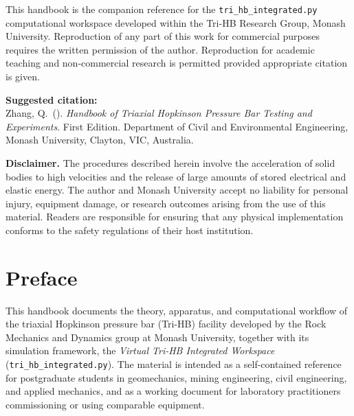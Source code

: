 \documentclass[11pt,a4paper,openany]{book}
\theoremstyle{handbook}
\begin{document}
\bigskip
\noindent This handbook is the companion reference for the
\texttt{tri\_hb\_integrated.py} computational workspace developed within the
Tri-HB Research Group, Monash University. Reproduction of any part of this
work for commercial purposes requires the written permission of the author.
Reproduction for academic teaching and non-commercial research is permitted
provided appropriate citation is given.

\bigskip
\noindent\textbf{Suggested citation:}\\
Zhang, Q.\ (\the\year). \textit{Handbook of Triaxial Hopkinson Pressure Bar
Testing and Experiments}. First Edition. Department of Civil and Environmental
Engineering, Monash University, Clayton, VIC, Australia.

\bigskip
\noindent\textbf{Disclaimer.} The procedures described herein involve the
acceleration of solid bodies to high velocities and the release of large
amounts of stored electrical and elastic energy. The author and Monash
University accept no liability for personal injury, equipment damage, or
research outcomes arising from the use of this material. Readers are
responsible for ensuring that any physical implementation conforms to the
safety regulations of their host institution.
\vfill

\chapter*{Preface}

\noindent This handbook documents the theory, apparatus, and computational
workflow of the triaxial Hopkinson pressure bar (Tri-HB) facility developed by
the Rock Mechanics and Dynamics group at Monash University, together with its
simulation framework, the \emph{Virtual Tri-HB Integrated Workspace}
(\texttt{tri\_hb\_integrated.py}). The material is intended as a self-contained
reference for postgraduate students in geomechanics, mining engineering,
civil engineering, and applied mechanics, and as a working document for
laboratory practitioners commissioning or using comparable equipment.
\end{document}
